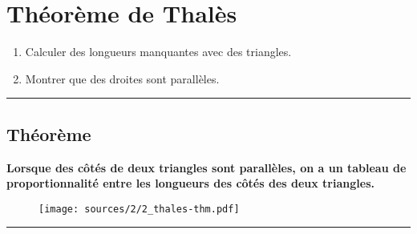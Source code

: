 \documentclass[12pt]{article}
\newcommand{\horrule}[1]{\rule{\linewidth}{#1}} %
\begin{document}

\newtheorem{Definition}{Définition}
\newtheorem{Theorem}{Théorème}
\newtheorem{Proposition}{Propriété}

\renewcommand{\labelitemi}{$\bullet$}
\renewcommand{\labelitemii}{$\circ$}

\setlength{\columnseprule}{1pt}

\section*{Théorème de Thalès}

\begin{enumerate}
\item[1.] Calculer des longueurs manquantes avec des triangles.
\item[2.] Montrer que des droites sont parallèles.
\end{enumerate}

\horrule{1px}

\begin{multicols}{2}

  \subsection*{Théorème}

  \textbf{Lorsque des côtés de deux triangles sont parallèles, on a un tableau de proportionnalité entre les longueurs des côtés des deux triangles.}

  \begin{figure}[H]
    \centering
    \texttt{[image: sources/2/2\_thales-thm.pdf]}
  \end{figure}

\end{multicols}

\vspace{-0.5cm}
\horrule{1px}
\vspace{-1cm}
\end{document}
